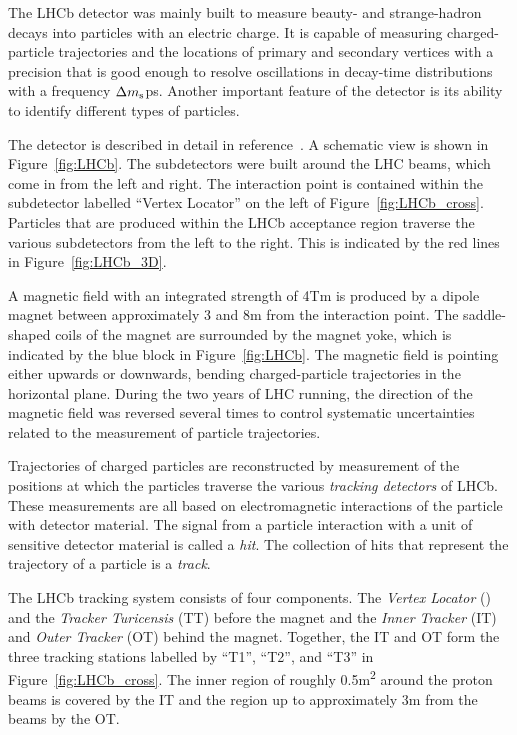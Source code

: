 The LHCb detector was mainly built to measure beauty- and strange-hadron decays into particles with an electric charge. It is capable of
measuring charged-particle trajectories and the locations of primary and secondary vertices with a precision that is good enough to resolve
oscillations in decay-time distributions with a frequency $\Delta m_\text{s}$\unitsp{}ps. Another important feature of the detector is its
ability to identify different types of particles.

The detector is described in detail in reference~\cite{Alves:2008zz}. A schematic view is shown in Figure~\ref{fig:LHCb}. The subdetectors
were built around the LHC beams, which come in from the left and right. The interaction point is contained within the subdetector labelled
``Vertex Locator'' on the left of Figure~\ref{fig:LHCb_cross}. Particles that are produced within the LHCb acceptance region traverse the
various subdetectors from the left to the right. This is indicated by the red lines in Figure~\ref{fig:LHCb_3D}.

A magnetic field with an integrated strength of 4\unitsp{}Tm is produced by a dipole magnet between approximately 3 and 8\unitsp{}m from
the interaction point. The saddle-shaped coils of the magnet are surrounded by the magnet yoke, which is indicated by the blue block in
Figure~\ref{fig:LHCb}. The magnetic field is pointing either upwards or downwards, bending charged-particle trajectories in the horizontal
plane. During the two years of LHC running, the direction of the magnetic field was reversed several times to control systematic
uncertainties related to the measurement of particle trajectories.

Trajectories of charged particles are reconstructed by measurement of the positions at which the particles traverse the various
\emph{tracking detectors} of LHCb. These measurements are all based on electromagnetic interactions of the particle with detector material.
The signal from a particle interaction with a unit of sensitive detector material is called a \emph{hit}. The collection of hits that
represent the trajectory of a particle is a \emph{track}.

The LHCb tracking system consists of four components. The \emph{Vertex Locator} (\velo) and the \emph{Tracker Turicensis} (TT)
before the magnet and the \emph{Inner Tracker} (IT) and \emph{Outer Tracker} (OT) behind the magnet. Together, the IT and OT form the
three tracking stations labelled by ``T1'', ``T2'', and ``T3'' in Figure~\ref{fig:LHCb_cross}. The inner region of roughly
0.5\unitsp{}m\textsuperscript{2} around the proton beams is covered by the IT and the region up to approximately 3\unitsp{}m from the beams
by the OT.

